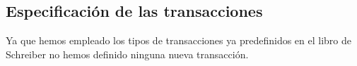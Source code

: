 \documentclass[12pt,a4paper,twoside,spanish]{article}      %
\begin{document}
\subsection{Especificación de las transacciones}
Ya que hemos empleado los tipos de transacciones ya predefinidos en el libro de Schreiber no hemos definido ninguna nueva transacción.
\end{document}
